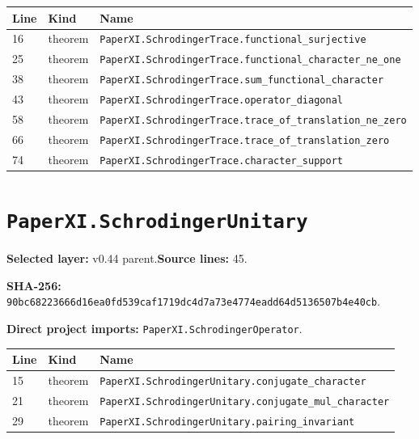 \documentclass[10pt,oneside]{book}
\begin{document}
\begin{longtable}{@{}p{}p{}p{}@{}}\toprule Line&Kind&Name\\\midrule\endhead

16&theorem&\nolinkurl{PaperXI.SchrodingerTrace.functional_surjective}\\

25&theorem&\nolinkurl{PaperXI.SchrodingerTrace.functional_character_ne_one}\\

38&theorem&\nolinkurl{PaperXI.SchrodingerTrace.sum_functional_character}\\

43&theorem&\nolinkurl{PaperXI.SchrodingerTrace.operator_diagonal}\\

58&theorem&\nolinkurl{PaperXI.SchrodingerTrace.trace_of_translation_ne_zero}\\

66&theorem&\nolinkurl{PaperXI.SchrodingerTrace.trace_of_translation_zero}\\

74&theorem&\nolinkurl{PaperXI.SchrodingerTrace.character_support}\\

\bottomrule\end{longtable}

\section{\texorpdfstring{\nolinkurl{PaperXI.SchrodingerUnitary}}{PaperXI.SchrodingerUnitary}}\label{module:PaperXI.SchrodingerUnitary}

\textbf{Selected layer:} v0.44 parent.\quad\textbf{Source lines:} 45.\par\textbf{SHA-256:} {\scriptsize\nolinkurl{90bc68223666d16ea0fd539caf1719dc4d7a73e4774eadd64d5136507b4e40cb}}.


\textbf{Direct project imports:} \nolinkurl{PaperXI.SchrodingerOperator}.

\begin{longtable}{@{}p{}p{}p{}@{}}\toprule Line&Kind&Name\\\midrule\endhead

15&theorem&\nolinkurl{PaperXI.SchrodingerUnitary.conjugate_character}\\

21&theorem&\nolinkurl{PaperXI.SchrodingerUnitary.conjugate_mul_character}\\

29&theorem&\nolinkurl{PaperXI.SchrodingerUnitary.pairing_invariant}\\

\bottomrule\end{longtable}
\end{document}
